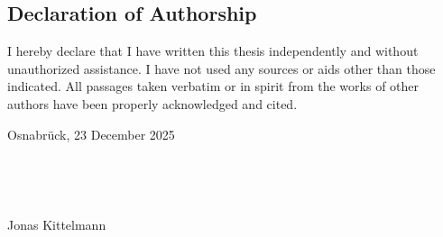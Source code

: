 \documentclass[
	twoside,
	fontsize=12pt,
	headsepline,
	cleardoublepage=empty,
	numbers=noenddot,
	bibliography=totoc,
]{scrbook}
\renewcommand{\thesisAuthor}{Jonas Kittelmann}
\renewcommand{\thesisDate}{Osnabrück, 23 December 2025}
\begin{document}

  

\tableofcontents

\cleardoublepage
{}








\listoffigures
\lstlistoflistings
%
%
\printbibliography

\cleardoublepage
\thispagestyle{empty}
\subsection*{Declaration of Authorship}

I hereby declare that I have written this thesis independently and without unauthorized assistance. I have not used any sources or aids other than those indicated. All passages taken verbatim or in spirit from the works of other authors have been properly acknowledged and cited.

	\thesisDate

~

~

	\thesisAuthor
\end{document}
